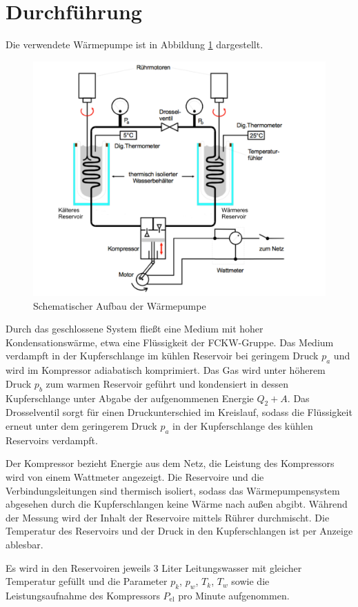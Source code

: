 \section{Durchführung}
\label{sec:Durchfuehrung}
Die verwendete Wärmepumpe ist in Abbildung \ref{fig:pumpe} dargestellt.
\begin{figure}
	\includegraphics[width=\textwidth]{Bilder/Abbildung.pdf}
	\caption{Schematischer Aufbau der Wärmepumpe \cite{V206}}
	\label{fig:pumpe}
\end{figure}
Durch das geschlossene System fließt eine Medium mit hoher Kondensationswärme, etwa eine Flüssigkeit der FCKW-Gruppe.
Das Medium verdampft in der Kupferschlange im kühlen Reservoir bei geringem Druck $p_a$ und wird im Kompressor adiabatisch komprimiert. 
Das Gas wird unter höherem Druck $p_b$ zum warmen Reservoir geführt und kondensiert in dessen Kupferschlange unter Abgabe der aufgenommenen Energie $Q_2+A$.
Das Drosselventil sorgt für einen Druckunterschied im Kreislauf, sodass die Flüssigkeit erneut unter dem geringerem Druck $p_a$ in der Kupferschlange des kühlen Reservoirs verdampft. 

Der Kompressor bezieht Energie aus dem Netz, die Leistung des Kompressors wird von einem Wattmeter angezeigt. 
Die Reservoire und die Verbindungsleitungen sind thermisch isoliert, sodass das Wärmepumpensystem abgesehen durch die Kupferschlangen keine Wärme nach außen abgibt.
Während der Messung wird der Inhalt der Reservoire mittels Rührer durchmischt. Die Temperatur des Reservoirs und der Druck in den Kupferschlangen ist per Anzeige ablesbar.

Es wird in den Reservoiren jeweils 3 Liter Leitungswasser mit gleicher Temperatur gefüllt und die Parameter $p_k$, $p_w$, $T_k$, $T_w$ sowie die Leistungsaufnahme des Kompressors $P_\text{el}$ pro Minute aufgenommen.